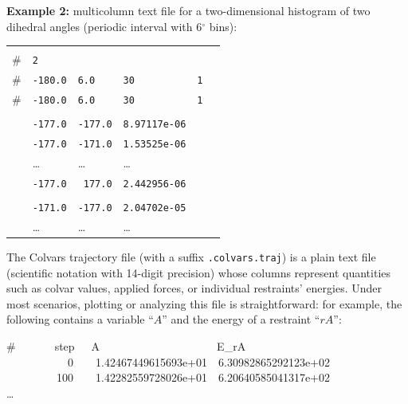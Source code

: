 \noindent\textbf{Example 2:} multicolumn text file for a two-dimensional histogram of two dihedral angles (periodic interval with 6$^\circ$ bins):

\begin{tabular}{l l l l l l}
& & & & \\
\# & \texttt{2} & & & & \\
\# & \texttt{-180.0} & \texttt{6.0} & \texttt{30} & \texttt{1} \\
\# & \texttt{-180.0} & \texttt{6.0} & \texttt{30} & \texttt{1} \\
\\
& \texttt{-177.0} & \texttt{-177.0} & \texttt{8.97117e-06} & & \\
& \texttt{-177.0} & \texttt{-171.0} & \texttt{1.53525e-06} & & \\
& \ldots & \ldots & \ldots & & \\
& \texttt{-177.0} & \texttt{ 177.0} & \texttt{2.442956-06} & & \\
\\
& \texttt{-171.0} & \texttt{-177.0} & \texttt{2.04702e-05} & & \\
& \ldots & \ldots & \ldots & & \\
\end{tabular}



The Colvars trajectory file (with a suffix \texttt{.colvars.traj}) is a plain text file (scientific notation with 14-digit precision) whose columns represent quantities such as colvar values, applied forces, or individual restraints' energies.  Under most scenarios, plotting or analyzing this file is straightforward: for example, the following contains a variable ``$A$'' and the energy of a restraint ``${rA}$'':
\begin{datafileexample}
\-\#~~~~~~~step~~~A~~~~~~~~~~~~~~~~~~~~~E\_rA\\
\-~~~~~~~~~~~0~~~~1.42467449615693e+01~~6.30982865292123e+02\\
\-~~~~~~~~~100~~~~1.42282559728026e+01~~6.20640585041317e+02\\
\-\ldots
\end{datafileexample}

